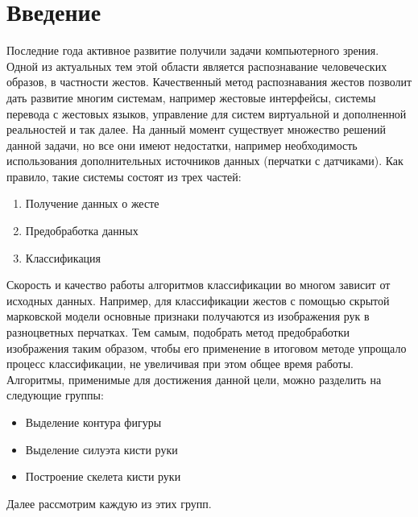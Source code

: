 \section{Введение}
\label{sec:Intro}

Последние года активное развитие получили задачи компьютерного зрения. Одной из актуальных тем этой области является распознавание человеческих образов, в частности жестов. Качественный метод распознавания жестов позволит дать развитие многим системам, например жестовые интерфейсы, системы перевода с жестовых языков, управление для систем виртуальной и дополненной реальностей и так далее. На данный момент существует множество решений данной задачи\cite{slr}, но все они имеют недостатки, например необходимость использования дополнительных источников данных (перчатки с датчиками). 
Как правило, такие системы состоят из трех частей:

\begin{enumerate}
	\item Получение данных о жесте
	\item Предобработка данных
	\item Классификация
\end{enumerate}

Скорость и качество работы алгоритмов классификации во многом зависит от исходных данных. Например, для классификации жестов с помощью скрытой марковской модели \cite{inproceedings} основные признаки получаются из изображения рук в разноцветных перчатках. Тем самым, подобрать метод предобработки изображения таким образом, чтобы его применение в итоговом методе упрощало процесс классификации, не увеличивая при этом общее время работы. Алгоритмы, применимые для достижения данной цели, можно разделить на следующие группы:
\begin{itemize}
	\item Выделение контура фигуры
	\item Выделение силуэта кисти руки
	\item Построение скелета кисти руки
\end{itemize}

Далее рассмотрим каждую из этих групп.